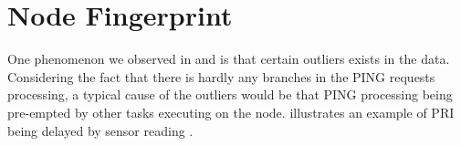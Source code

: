 \section{Node Fingerprint} \label{Pingload}

One phenomenon we observed in  and  is that certain outliers exists in the data. Considering the fact that there is hardly any branches in the PING requests processing, a typical cause of the outliers would be that PING processing being pre-empted by other tasks executing on the node.   illustrates an example of PRI being delayed by sensor reading .

